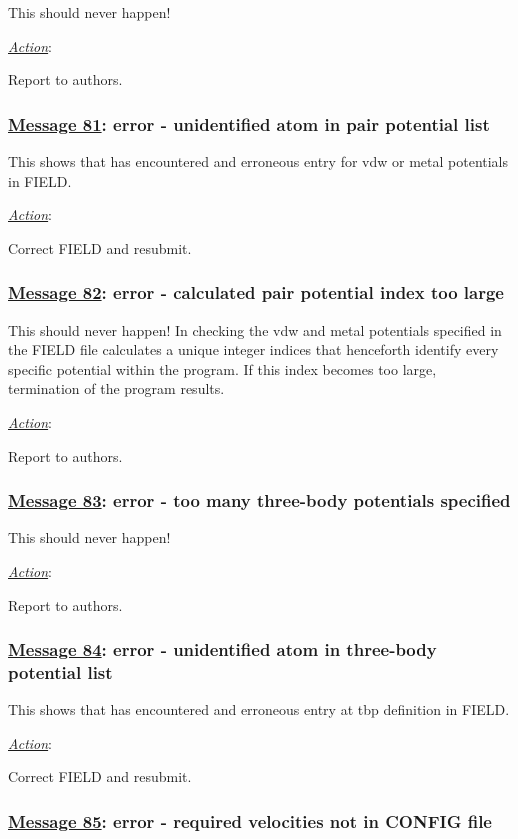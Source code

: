 This should never happen!

\noindent \underline{\em Action}:

Report to authors.

\subsubsection*{\underline{Message 81}: error - unidentified atom in pair potential list}

This shows that \D has encountered and erroneous entry for vdw or
metal potentials in FIELD.

\noindent \underline{\em Action}:

Correct FIELD and resubmit.

\subsubsection*{\underline{Message 82}: error - calculated pair potential index too large}

This should never happen!  In checking the vdw and metal
potentials specified in the FIELD file \D calculates a unique
integer indices that henceforth identify every specific potential
within the program.  If this index becomes too large, termination
of the program results.

\noindent \underline{\em Action}:

Report to authors.

\subsubsection*{\underline{Message 83}: error - too many three-body potentials specified}

This should never happen!

\noindent \underline{\em Action}:

Report to authors.

\subsubsection*{\underline{Message 84}: error - unidentified atom in three-body potential list}

This shows that \D has encountered and erroneous entry at tbp
definition in FIELD.

\noindent \underline{\em Action}:

Correct FIELD and resubmit.

\subsubsection*{\underline{Message 85}: error - required velocities not in CONFIG file}

